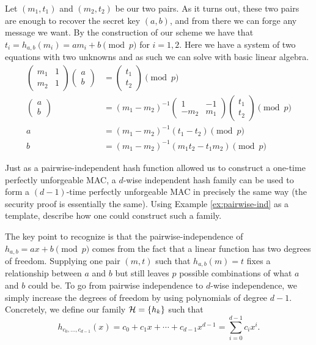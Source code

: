 \documentclass[11pt]{article}
\begin{document}
\begin{answer}
  Let \((m_1, t_1)\) and \((m_2, t_2)\) be our two pairs. As it turns
  out, these two pairs are enough to recover the secret key \((a,b)\),
  and from there we can forge any message we want. By the construction
  of our scheme we have that \(t_i = h_{a,b}(m_i) = am_i + b \pmod p\)
  for \(i = 1,2\). Here we have a system of two equations with two
  unknowns and as such we can solve with basic linear algebra.
  \begin{align*}
    \begin{pmatrix} m_1 & 1 \\ m_2 & 1 \end{pmatrix} \begin{pmatrix} a \\ b
    \end{pmatrix} &= \begin{pmatrix} t_1 \\ t_2 \end{pmatrix} \pmod {p} \\
    \begin{pmatrix} a \\ b \end{pmatrix} &= (m_1 - m_2)^{-1} \begin{pmatrix} 1 &
      -1 \\ -m_2 & m_1 \end{pmatrix} \begin{pmatrix} t_1 \\ t_2 \end{pmatrix} \pmod{p} \\ 
    a &= (m_1 - m_2)^{-1} (t_1 - t_2) \pmod {p} \\
    b &= (m_1 - m_2)^{-1} (m_1t_2 - t_1m_2) \pmod{p}
  \end{align*}
\end{answer}
  
\begin{question}
  Just as a pairwise-independent hash function allowed us to construct
  a one-time perfectly unforgeable MAC, a \(d\)-wise independent hash
  family can be used to form a \((d-1)\)-time perfectly unforgeable
  MAC in precisely the same way (the security proof is essentially the
  same). Using Example \ref{ex:pairwise-ind} as a template, describe
  how one could construct such a family.
\end{question}

\begin{answer}
  The key point to recognize is that the pairwise-independence of
  \(h_{a,b} = ax + b \pmod{p}\) comes from the fact that a linear
  function has two degrees of freedom.  Supplying one pair \((m,t)\)
  such that \(h_{a,b}(m) = t\) fixes a relationship between \(a\) and
  \(b\) but still leaves \(p\) possible combinations of what \(a\) and
  \(b\) could be. To go from pairwise independence to \(d\)-wise
  independence, we simply increase the degrees of freedom by using
  polynomials of degree \(d-1\).  Concretely, we define our family
  \(\mathcal{H} = \{h_k\}\) such that
  \[h_{c_0, \ldots, c_{d-1}}(x) = c_0 + c_1x + \cdots + c_{d-1}x^{d-1}
    = \sum_{i=0}^{d-1} c_i x^i.\]
\end{answer}
\end{document}
